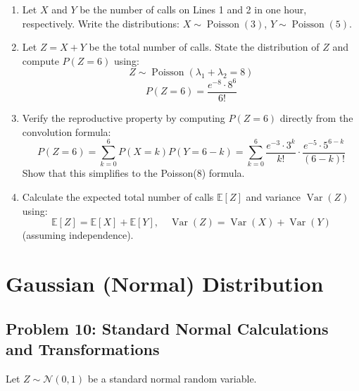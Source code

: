\documentclass[12pt]{article}
\DeclareMathOperator{\Var}{Var}
\DeclareMathOperator{\Pois}{Poisson}
\begin{document}
\begin{enumerate}[label=(\alph*)]
\item Let \(X\) and \(Y\) be the number of calls on Lines 1 and 2 in one hour, respectively. Write the distributions: \(X \sim \Pois(3)\), \(Y \sim \Pois(5)\).

\item Let \(Z = X + Y\) be the total number of calls. State the distribution of \(Z\) and compute \(P(Z = 6)\) using:
\[
Z \sim \Pois(\lambda_1 + \lambda_2 = 8)
\]
\[
P(Z = 6) = \frac{e^{-8} \cdot 8^6}{6!}
\]

\item Verify the reproductive property by computing \(P(Z = 6)\) directly from the convolution formula:
\[
P(Z = 6) = \sum_{k=0}^{6} P(X = k)P(Y = 6-k) = \sum_{k=0}^{6} \frac{e^{-3} \cdot 3^k}{k!} \cdot \frac{e^{-5} \cdot 5^{6-k}}{(6-k)!}
\]
Show that this simplifies to the Poisson(8) formula.

\item Calculate the expected total number of calls \(\mathbb{E}[Z]\) and variance \(\Var(Z)\) using:
\[
\mathbb{E}[Z] = \mathbb{E}[X] + \mathbb{E}[Y], \quad \Var(Z) = \Var(X) + \Var(Y)
\]
(assuming independence).
\end{enumerate}


\section{Gaussian (Normal) Distribution}

\subsection*{Problem 10: Standard Normal Calculations and Transformations}

Let \(Z \sim \mathcal{N}(0, 1)\) be a standard normal random variable.
\end{document}
